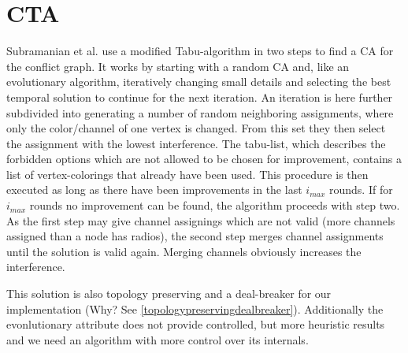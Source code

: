   \section{\ac{CTA}}
    Subramanian et al.\cite{CTA} use a modified Tabu-algorithm \cite{tabu} in two steps to find a \ac{CA} for the conflict graph.
    It works by starting with a random \ac{CA} and, like an evolutionary algorithm, 
    iteratively changing small details and selecting the best temporal solution to continue for the next iteration.
    An iteration is here further subdivided into generating a number of random neighboring assignments, where only the color/channel of one vertex is changed.
    From this set they then select the assignment with the lowest interference.
    The tabu-list, which describes the forbidden options which are not allowed to be chosen for improvement, contains a list of vertex-colorings that already have been used.
    This procedure is then executed as long as there have been improvements in the last \textit{$i_{max}$} rounds.
    If for \textit{$i_{max}$} rounds no improvement can be found, the algorithm proceeds with step two.
    As the first step may give channel assignings which are not valid (more channels assigned than a node has radios), the second step merges channel assignments 
    until the solution is valid again. Merging channels obviously increases the interference.
    
    This solution is also topology preserving and a deal-breaker for our implementation (Why? See \ref{topologypreservingdealbreaker}).
    Additionally the evonlutionary attribute does not provide controlled, but more heuristic results and we need an algorithm with more control over its internals.